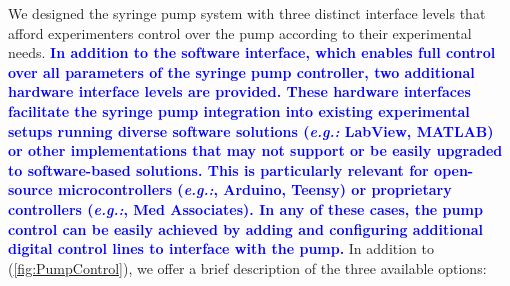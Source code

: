 We designed the syringe pump system with three distinct interface levels that afford experimenters control over the pump according to their experimental needs. \textcolor{blue}{\textbf{In addition to the software interface, which enables full control over all parameters of the syringe pump controller, two additional hardware interface levels are provided. These hardware interfaces facilitate the syringe pump integration into existing experimental setups running diverse software solutions (\textit{e.g.:} LabView, MATLAB) or other implementations that may not support or be easily upgraded to software-based solutions. This is particularly relevant for open-source microcontrollers (\textit{e.g.:}, Arduino, Teensy) or proprietary controllers (\textit{e.g.:}, Med Associates). In any of these cases, the pump control can be easily achieved by adding and configuring additional digital control lines to interface with the pump.}} In addition to (\cref{fig:PumpControl}), we offer a brief description of the three available options:
